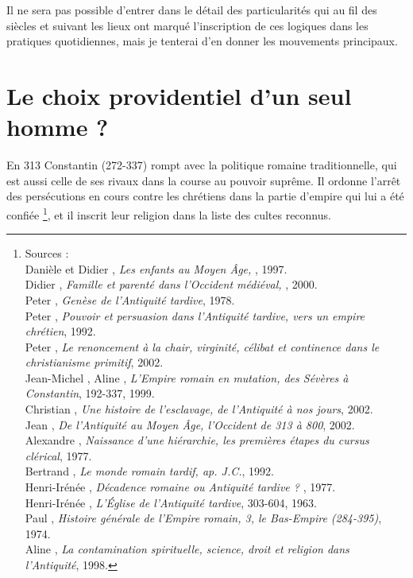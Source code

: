 Il ne sera pas possible d'entrer dans le détail des particularités qui au fil des siècles et suivant les lieux ont marqué l'inscription de ces logiques dans les pratiques quotidiennes, mais je tenterai d'en donner les mouvements principaux.

\section{Le choix providentiel d'un seul homme ?}
En 313  Constantin (272-337) rompt avec la politique romaine traditionnelle, qui est aussi celle de ses rivaux dans la course au pouvoir suprême. Il ordonne l'arrêt des persécutions en cours contre les chrétiens dans la partie d'empire qui lui a été confiée \footnote{Sources :
\\Danièle  et Didier , \emph{Les enfants au Moyen Âge, }, 1997.
\\Didier {}, \emph{Famille et parenté dans l'Occident médiéval, }, 2000.
\\Peter {}, \emph{Genèse de l'Antiquité tardive}, 1978.
\\Peter {}, \emph{Pouvoir et persuasion dans l'Antiquité tardive, vers un empire chrétien}, 1992.
\\Peter {}, \emph{Le renoncement à la chair, virginité, célibat et continence dans le christianisme primitif}, 2002.
\\Jean-Michel , Aline , \emph{L'Empire romain en mutation, des Sévères à Constantin}, 192-337, 1999.
\\Christian {}, \emph{Une histoire de l'esclavage, de l'Antiquité à nos jours}, 2002.
\\Jean {}, \emph{De l'Antiquité au Moyen Âge, l'Occident de 313 à 800}, 2002.
\\Alexandre {}, \emph{Naissance d'une hiérarchie, les premières étapes du cursus clérical}, 1977.
\\Bertrand {}, \emph{Le monde romain tardif,  ap. J.C.}, 1992.
\\Henri-Irénée , \emph{Décadence romaine ou Antiquité tardive ? }, 1977.
\\Henri-Irénée , \emph{L'Église de l'Antiquité tardive}, 303-604, 1963.
\\Paul {}, \emph{Histoire générale de l'Empire romain, 3, le Bas-Empire (284-395)}, 1974.
\\Aline {}, \emph{La contamination spirituelle, science, droit et religion dans l'Antiquité}, 1998.},
et il inscrit leur religion dans la liste des cultes reconnus. 


